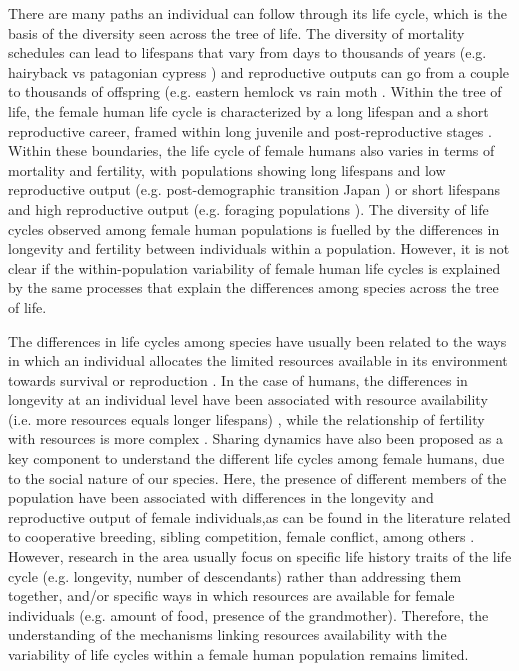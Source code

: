 \documentclass{article}
\begin{document}
There are many paths an individual can follow through its life cycle, which is the basis of the diversity seen across the tree of life. The diversity of mortality schedules can lead to lifespans that vary from days to thousands of years (e.g. hairyback vs patagonian cypress \citep{balsamo1988life,lara19933620}) and reproductive outputs can go from a couple to thousands of offspring (e.g. eastern hemlock vs rain moth \citep{tindale1932revision,van2017lifetime}. Within the tree of life, the female human life cycle is characterized by a long lifespan and a short reproductive career, framed within long juvenile and post-reproductive stages \citep{kaplan2000theory}. Within these boundaries, the life cycle of female humans also varies in terms of mortality and fertility, with populations showing long lifespans and low reproductive output (e.g. post-demographic transition Japan \citep{de2017maximum}) or short lifespans and high reproductive output (e.g. foraging populations \citep{migliano2007life}). The diversity of life cycles observed among female human populations is fuelled by the differences in longevity and fertility between individuals within a population. However, it is not clear if the within-population variability of female human life cycles is explained by the same processes that explain the differences among species across the tree of life. 

The differences in life cycles among species have usually been related to the ways in which an individual allocates the limited resources available in its environment towards survival or reproduction \citep{stearns2000life}. In the case of humans, the differences in longevity at an individual level have been associated with resource availability (i.e. more resources equals longer lifespans) \citep{kaplan2003embodied}, while the relationship of fertility with resources is more complex \citep{mulder1998demographic,sear2016understanding}. Sharing dynamics have also been proposed as a key component to understand the different life cycles among female humans, due to the social nature of our species. Here, the presence of different members of the population have been associated with differences in the longevity and reproductive output of female individuals,as can be found in the literature related to cooperative breeding, sibling competition, female conflict, among others \citep{ivey2000cooperative,nitsch2013elder,mace2012female,sear2011much}. However, research in the area usually focus on specific life history traits of the life cycle (e.g. longevity, number of descendants) rather than addressing them together, and/or specific ways in which resources are available for female individuals (e.g. amount of food, presence of the grandmother). Therefore, the understanding of the mechanisms linking resources availability with the variability of life cycles within a female human population remains limited.
\end{document}
